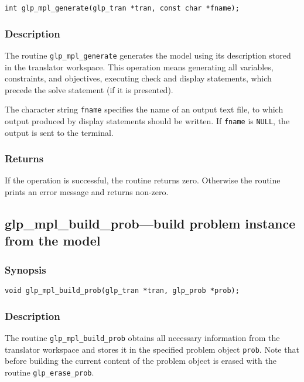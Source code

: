 \begin{verbatim}
int glp_mpl_generate(glp_tran *tran, const char *fname);
\end{verbatim}

\subsubsection*{Description}

The routine \verb|glp_mpl_generate| generates the model using its
description stored in the translator workspace. This operation means
generating all variables, constraints, and objectives, executing check
and display statements, which precede the solve statement (if it is
presented).

The character string \verb|fname| specifies the name of an output text
file, to which output produced by display statements should be written.
If \verb|fname| is \verb|NULL|, the output is sent to the terminal.

\subsubsection*{Returns}

If the operation is successful, the routine returns zero. Otherwise
the routine prints an error message and returns non-zero.

\subsection{glp\_mpl\_build\_prob---build problem instance from the
model}

\subsubsection*{Synopsis}

\begin{verbatim}
void glp_mpl_build_prob(glp_tran *tran, glp_prob *prob);
\end{verbatim}

\subsubsection*{Description}

The routine \verb|glp_mpl_build_prob| obtains all necessary information
from the translator workspace and stores it in the specified problem
object \verb|prob|. Note that before building the current content of
the problem object is erased with the routine \verb|glp_erase_prob|.


